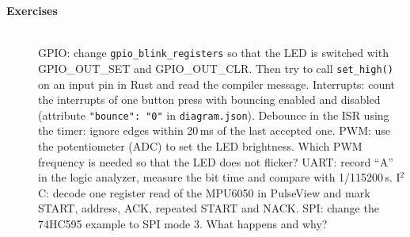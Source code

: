 \begin{description}
\item[{\rot\bf Exercises}]~\\[-\lblskip]
\bi
	\ite GPIO: change \texttt{gpio\_blink\_registers} so that the LED is switched with GPIO\_OUT\_SET and GPIO\_OUT\_CLR. Then try to call \texttt{set\_high()} on an input pin in Rust and read the compiler message.
	\ite Interrupts: count the interrupts of one button press with bouncing enabled and disabled (attribute \texttt{"bounce": "0"} in \texttt{diagram.json}). Debounce in the ISR using the timer: ignore edges within 20\,ms of the last accepted one.
	\ite PWM: use the potentiometer (ADC) to set the LED brightness. Which PWM frequency is needed so that the LED does not flicker?
	\ite UART: record ``A'' in the logic analyzer, measure the bit time and compare with 1/115200\,s.
	\ite I$^2$C: decode one register read of the MPU6050 in PulseView and mark START, address, ACK, repeated START and NACK.
	\ite SPI: change the 74HC595 example to SPI mode 3. What happens and why?
\ei
\end{description}
